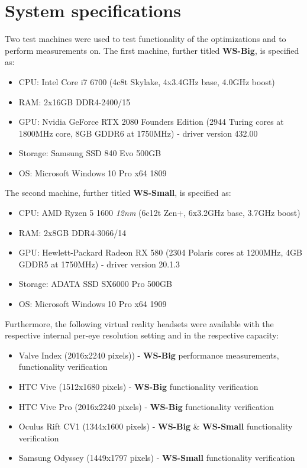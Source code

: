 \section{System specifications}
Two test machines were used to test functionality of the optimizations and to perform measurements on. 
The first machine, further titled \textbf{WS-Big}, is specified as:
\begin{itemize}
\item CPU: Intel Core i7 6700 (4c8t Skylake, 4x3.4GHz base, 4.0GHz boost)
\item RAM: 2x16GB DDR4-2400/15
\item GPU: Nvidia GeForce RTX 2080 Founders Edition (2944 Turing cores at 1800MHz core, 8GB GDDR6 at 1750MHz) - driver version 432.00
\item Storage: Samsung SSD 840 Evo 500GB
\item OS: Microsoft Windows 10 Pro x64 1809
\end{itemize} 
The second machine, further titled \textbf{WS-Small}, is specified as:
\begin{itemize}
\item CPU: AMD Ryzen 5 1600 \textit{12nm} (6c12t Zen+, 6x3.2GHz base, 3.7GHz boost)
\item RAM: 2x8GB DDR4-3066/14
\item GPU: Hewlett-Packard Radeon RX 580 (2304 Polaris cores at 1200MHz, 4GB GDDR5 at 1750MHz) - driver version 20.1.3
\item Storage: ADATA SSD SX6000 Pro 500GB
\item OS: Microsoft Windows 10 Pro x64 1909
\end{itemize} 
Furthermore, the following virtual reality headsets were available with the respective internal per-eye resolution setting and in the respective capacity:
\begin{itemize}
\item Valve Index (2016x2240 pixels)) - \textbf{WS-Big} performance measurements, functionality verification
\item HTC Vive (1512x1680 pixels) - \textbf{WS-Big} functionality verification
\item HTC Vive Pro (2016x2240 pixels) - \textbf{WS-Big} functionality verification
\item Oculus Rift CV1 (1344x1600 pixels) - \textbf{WS-Big} \& \textbf{WS-Small} functionality verification
\item Samsung Odyssey (1449x1797 pixels) - \textbf{WS-Small} functionality verification
\end{itemize} 
